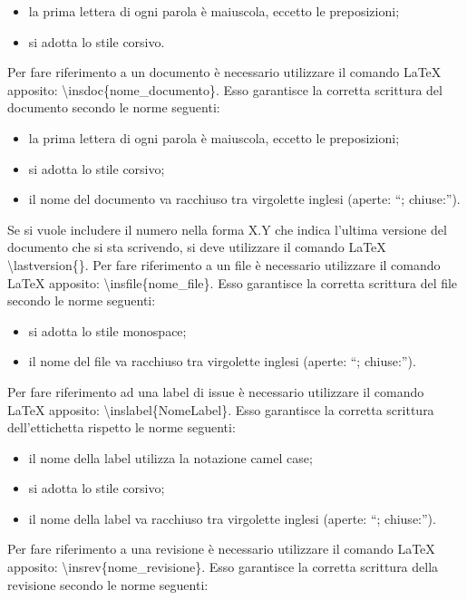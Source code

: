 					\begin{itemize}
						\item la prima lettera di ogni parola è maiuscola, eccetto le preposizioni;
						\item si adotta lo stile corsivo.
					\end{itemize}
					Per fare riferimento a un documento è necessario utilizzare il comando \LaTeX{} apposito: \textbackslash insdoc\{nome\_documento\}. Esso garantisce la corretta scrittura del documento secondo le norme seguenti:
					\begin{itemize}
						\item la prima lettera di ogni parola è maiuscola, eccetto le preposizioni;
						\item si adotta lo stile corsivo;
						\item il nome del documento va racchiuso tra virgolette inglesi (aperte: “; chiuse:”).
					\end{itemize}
					Se si vuole includere il numero nella forma X.Y che indica l’ultima versione del documento che si sta scrivendo, si deve utilizzare il comando \LaTeX{} \textbackslash lastversion\{\}.
					Per fare riferimento a un file è necessario utilizzare il comando \LaTeX{} apposito: \textbackslash insfile\{nome\_file\}. Esso garantisce la corretta scrittura del file secondo le norme seguenti:
					\begin{itemize}
						\item si adotta lo stile monospace;
						\item il nome del file va racchiuso tra virgolette inglesi (aperte: “; chiuse:”).
					\end{itemize}
					Per fare riferimento ad una label di issue è necessario utilizzare il comando \LaTeX{} apposito: \textbackslash inslabel\{NomeLabel\}. Esso garantisce la corretta scrittura dell'ettichetta rispetto le norme seguenti:
					\begin{itemize}
						\item il nome della label utilizza la notazione camel case;
						\item si adotta lo stile corsivo;
						\item il nome della label va racchiuso tra virgolette inglesi (aperte: “; chiuse:”).
					\end{itemize}
					Per fare riferimento a una revisione è necessario utilizzare il comando \LaTeX{} apposito: \textbackslash insrev\{nome\_revisione\}. Esso garantisce la corretta scrittura della revisione secondo le norme seguenti:
